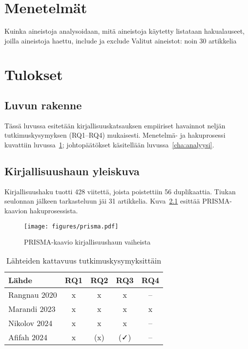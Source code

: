 \documentclass[bscthesis,finnish,oneside,biblatex]{uefcsthesis}
\begin{document}
\chapter{Menetelmät}
\label{cha:menetelmat}
Kuinka aineistoja analysoidaan, mitä aineistoja käytetty
listataan hakualauseet, joilla aineistoja haettu, include ja exclude
Valitut aineistot: noin 30 artikkelia

\chapter{Tulokset}
\label{cha:tulokset}

\section*{Luvun rakenne}
Tässä luvussa esitetään kirjallisuuskatsauksen empiiriset havainnot
neljän tutkimuskysymyksen (RQ1–RQ4) mukaisesti.  Menetelmä- ja
hakuprosessi kuvattiin luvussa~\ref{cha:menetelmat}; johtopäätökset
käsitellään luvussa~\ref{cha:analyysi}.

\section{Kirjallisuushaun yleiskuva}
Kirjallisuushaku tuotti 428 viitettä, joista poistettiin 56
duplikaattia. Tiukan seulonnan jälkeen tarkasteluun jäi 31 artikkelia.
Kuva~\ref{fig:prisma} esittää PRISMA-kaavion hakuprosessista.

\begin{figure}[H]
  \centering
  \texttt{[image: figures/prisma.pdf]}
  \caption{PRISMA-kaavio kirjallisuushaun vaiheista}
  \label{fig:prisma}
\end{figure}

\begin{table}[H]
  \caption{Lähteiden kattavuus tutkimuskysymyksittäin}
  \label{tab:rq_matrix}
  \footnotesize
  \begin{tabular}{lcccc}
    \toprule
    Lähde & RQ1 & RQ2 & RQ3 & RQ4 \\
    \midrule
    Rangnau 2020 & x & x & x & – \\
    Marandi 2023 & x & x & x & x \\
    Nikolov 2024 & x & x & x & – \\
    Afifah 2024  & x & (x) & (✓) & – \\
    \bottomrule
  \end{tabular}
\end{table}
\end{document}
